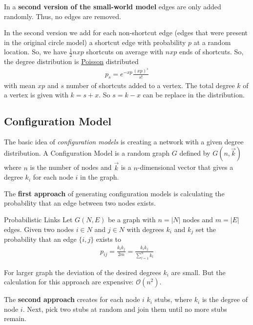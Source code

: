 \documentclass[english]{panikzettel}
\begin{document}
In a \textbf{second version of the small-world model} edges are only added randomly. Thus, no edges are removed.

In the second version we add for each non-shortcut edge (edges that were present in the original circle model) a shortcut edge with probability $ p $ at a random location.
So, we have $ \frac{1}{2} nxp $ shortcuts on average with $ nxp $ ends of shortcuts. So, the degree distribution is \hyperref[sec:poisson_dist]{Poisson} distributed
\begin{align*}
	p_s = e^{-xp}\frac{(xp)^s}{s!}
\end{align*}
with mean $ xp $ and $ s $ number of shortcuts added to a vertex. The total degree $ k $ of a vertex is given with $ k = s + x $. So $ s = k - x $ can be replace in the distribution.

\subsection{Configuration Model}
The basic idea of \emph{configuration models} is creating a network with a given degree distribution.
A Configuration Model is a random graph $ G $ defined by $ G(n,\vec{k}) $ where $ n $ is the number of nodes and $ \vec{k} $ is a $ n $-dimensional vector that gives a degree $ k_i $ for each node $ i $ in the graph.

The \textbf{first approach} of generating configuration models is calculating the probability that an edge between two nodes exists.

\begin{defi}{Probabilistic Links}
	Let $ G(N,E) $ be a graph with $ n = |N| $ nodes and $ m = |E| $ edges.
	Given two nodes $ i \in N $ and $ j \in N $ with degrees $ k_i $ and $ k_j $ set the probability that an edge $ \{i,j\} $ exists to
	\begin{align*}
		p_{ij} = \frac{k_i k_j}{2m} = \frac{k_i k_j}{\sum_{l=1}^{n}k_l}
	\end{align*}
\end{defi}

For larger graph the deviation of the desired degrees $ k_i $ are small. But the calculation for this approach are expensive: $ \mathcal{O}(n^2) $.

The \textbf{second approach} creates for each node $ i $ $ k_i $ stubs, where $ k_i $ is the degree of node $ i $. Next, pick two stubs at random and join them until no more stubs remain.
\end{document}
